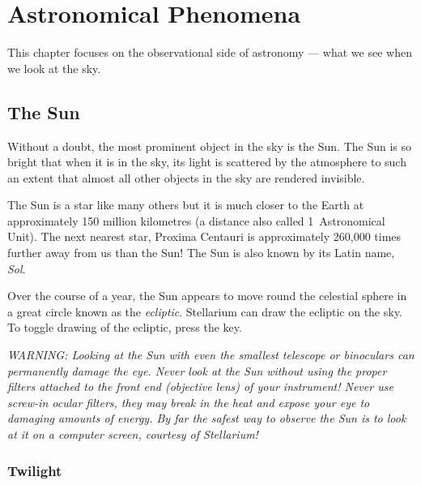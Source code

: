 


\chapter{Astronomical Phenomena}
\label{ch:Phenomena}

This chapter focuses on the observational side of astronomy --- what we
see when we look at the sky.

\section{The Sun}
\label{sec:Phenomena:sun}

Without a doubt, the most prominent object in the sky is the Sun. The
Sun is so bright that when it is in the sky, its light is scattered by
the atmosphere to such an extent that almost all other objects in the
sky are rendered invisible.

The Sun is a star like many others but it is much closer to the Earth
at approximately 150 million kilometres (a distance also called
1~Astronomical Unit). The next nearest star, Proxima Centauri is
approximately 260,000 times further away from us than the Sun! The Sun
is also known by its Latin name, \emph{Sol}.

Over the course of a year, the Sun appears to move round the celestial
sphere in a great circle known as the \emph{ecliptic}. Stellarium can
draw the ecliptic on the sky. To toggle drawing of the ecliptic, press
the \key{,} key.

\emph{WARNING: Looking at the Sun with even the smallest telescope or
  binoculars can permanently damage the eye. Never look at the Sun
  without using the proper filters attached to the front end
  (objective lens) of your instrument! Never use screw-in ocular
  filters, they may break in the heat and expose your eye to damaging
  amounts of energy. By far the safest way to observe the Sun is to
  look at it on a computer screen, courtesy of Stellarium!}

\subsection{Twilight}
\label{sec:Phenomena:sun:twilight}

